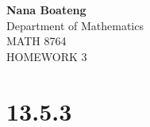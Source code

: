 \documentclass{article}\usepackage[]{graphicx}\usepackage[]{color}
\begin{document}

\begin{center}
{\Large {\bf Nana Boateng}} \\
\vspace{5mm}
{\Large Department of Mathematics} \\
\vspace{5mm}
{\Large MATH 8764} \\
\vspace{5mm}
{\Large HOMEWORK 3} \\
\end{center}

\section{13.5.3}
\end{document}
